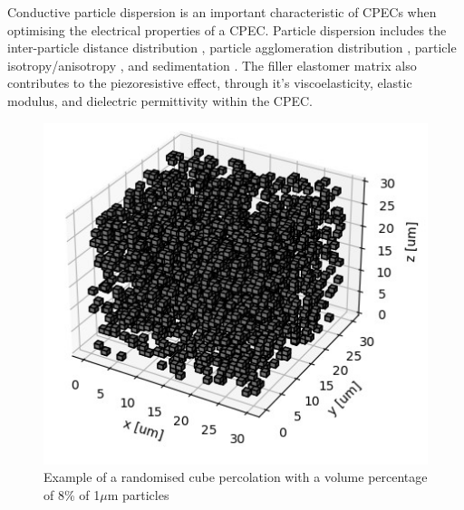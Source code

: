 Conductive particle dispersion is an important characteristic of CPECs when optimising the electrical properties of a CPEC. Particle dispersion includes the inter-particle distance distribution \cite{Kim2012}, particle agglomeration distribution \cite{Pegel2008}, particle isotropy/anisotropy \cite{Song2022}, and sedimentation \cite{Eklund2019}. The filler elastomer matrix also contributes to the piezoresistive effect, through it's viscoelasticity, elastic modulus, and dielectric permittivity within the CPEC.

\begin{figure}[H]
    \centering
    \includegraphics[width=0.6\linewidth]{Figures/simple_random_percolation.jpg}
    \caption{Example of a randomised cube percolation with a volume percentage of 8\% of 1$\mu$m particles}
    \label{fig:simp_rand_perc}
\end{figure}


